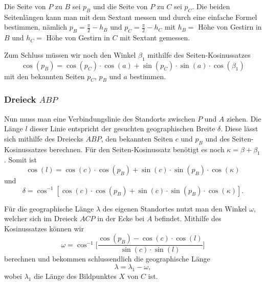 Die Seite von $P$ zu $B$ sei $p_B$ und die Seite von $P$ zu $C$ sei $p_C$.
Die beiden Seitenlängen kann man mit dem Sextant messen und durch eine einfache Formel bestimmen, nämlich $p_B=\frac{\pi}{2} - h_{B}$ und $p_C=\frac{\pi}{2} - h_{C}$ 
mit $h_B=$ Höhe von Gestirn in $B$ und $h_C=$ Höhe von Gestirn in $C$ mit Sextant gemessen.

Zum Schluss müssen wir noch den Winkel $\beta_1$ mithilfe des Seiten-Kosinussatzes
\[
\cos(p_B)=\cos(p_C)\cdot\cos(a)+\sin(p_C)\cdot\sin(a)\cdot\cos(\beta_1)
\]
mit den bekannten Seiten $p_C$, $p_B$ und $a$ bestimmen. 
\subsubsection{Dreieck $ABP$}
Nun muss man eine Verbindungslinie des Standorts zwischen $P$ und $A$ ziehen.
Die Länge $l$ dieser Linie entspricht der gesuchten geographischen Breite $\delta$.
Diese lässt sich mithilfe des Dreiecks $ABP$, den bekannten Seiten $c$ und $p_B$ und des Seiten-Kosinussatzes berechnen.
Für den Seiten-Kosinussatz benötigt es noch $\kappa=\beta + \beta_1$.
Somit ist
\[
\cos(l) = \cos(c)\cdot \cos(p_B) + \sin(c) \cdot \sin(p_B) \cdot \cos(\kappa)
\]
und
\[
\delta  =\cos^{-1} [\cos(c) \cdot \cos(p_B) + \sin(c) \cdot \sin(p_B) \cdot \cos(\kappa)].
\]

Für die geographische Länge $\lambda$ des eigenen Standortes nutzt man den Winkel $\omega$, welcher sich im Dreieck $ACP$ in der Ecke bei $A$ befindet.
Mithilfe des Kosinussatzes können wir
\[
\omega = \cos^{-1}  \bigg[\frac{\cos(p_B)-\cos(c) \cdot \cos(l)}{\sin(c) \cdot \sin(l)}\bigg]
\]
berechnen und bekommen schlussendlich die geographische Länge 
\[
\lambda=\lambda_1 - \omega,
\]
wobei $\lambda_1$ die Länge des Bildpunktes $X$ von $C$ ist.
